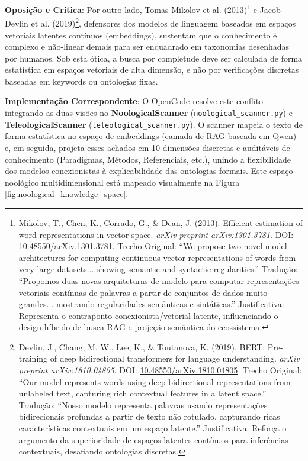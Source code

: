 \documentclass[12pt,a4paper,oneside]{abntex2}
\begin{document}
\textbf{Oposição e Crítica}: Por outro lado, Tomas Mikolov et al. (2013)\footnote{Mikolov, T., Chen, K., Corrado, G., \& Dean, J. (2013). Efficient estimation of word representations in vector space. \textit{arXiv preprint arXiv:1301.3781}. DOI: \href{https://doi.org/10.48550/arXiv.1301.3781}{10.48550/arXiv.1301.3781}. Trecho Original: ``We propose two novel model architectures for computing continuous vector representations of words from very large datasets... showing semantic and syntactic regularities.'' Tradução: ``Propomos duas novas arquiteturas de modelo para computar representações vetoriais contínuas de palavras a partir de conjuntos de dados muito grandes... mostrando regularidades semânticas e sintáticas.'' Justificativa: Representa o contraponto conexionista/vetorial latente, influenciando o design híbrido de busca RAG e projeção semântica do ecossistema.} e Jacob Devlin et al. (2019)\footnote{Devlin, J., Chang, M. W., Lee, K., \& Toutanova, K. (2019). BERT: Pre-training of deep bidirectional transformers for language understanding. \textit{arXiv preprint arXiv:1810.04805}. DOI: \href{https://doi.org/10.48550/arXiv.1810.04805}{10.48550/arXiv.1810.04805}. Trecho Original: ``Our model represents words using deep bidirectional representations from unlabeled text, capturing rich contextual features in a latent space.'' Tradução: ``Nosso modelo representa palavras usando representações bidirecionais profundas a partir de texto não rotulado, capturando ricas características contextuais em um espaço latente.'' Justificativa: Reforça o argumento da superioridade de espaços latentes contínuos para inferências contextuais, desafiando ontologias discretas.}, defensores dos modelos de linguagem baseados em espaços vetoriais latentes contínuos (embeddings), sustentam que o conhecimento é complexo e não-linear demais para ser enquadrado em taxonomias desenhadas por humanos. Sob esta ótica, a busca por completude deve ser calculada de forma estatística em espaços vetoriais de alta dimensão, e não por verificações discretas baseadas em keywords ou ontologias fixas.

\textbf{Implementação Correspondente}: O OpenCode resolve este conflito integrando as duas visões no \textbf{NoologicalScanner} (\texttt{noological\_scanner.py}) e \textbf{TeleologicalScanner} (\texttt{teleological\_scanner.py}). O scanner mapeia o texto de forma estatística no espaço de embeddings (camada de RAG baseada em Qwen) e, em seguida, projeta esses achados em 10 dimensões discretas e auditáveis de conhecimento (Paradigmas, Métodos, Referenciais, etc.), unindo a flexibilidade dos modelos conexionistas à explicabilidade das ontologias formais. Este espaço noológico multidimensional está mapeado visualmente na Figura \ref{fig:noological_knowledge_space}.
\end{document}
